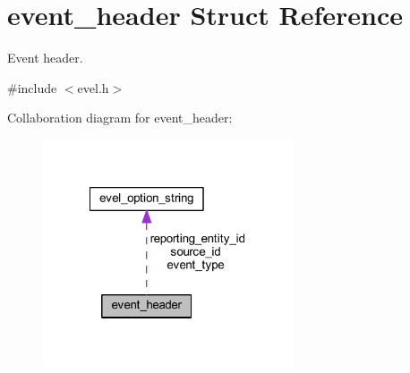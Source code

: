 \hypertarget{structevent__header}{}\section{event\+\_\+header Struct Reference}
\label{structevent__header}


Event header.  




{\ttfamily \#include $<$evel.\+h$>$}



Collaboration diagram for event\+\_\+header\+:
\nopagebreak
\begin{figure}[H]
\begin{center}
\leavevmode
\includegraphics[width=210pt]{structevent__header__coll__graph}
\end{center}
\end{figure}
